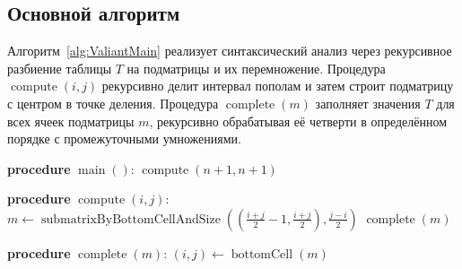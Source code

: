 \subsection{Основной алгоритм}

Алгоритм~\ref{alg:ValiantMain} реализует синтаксический анализ через рекурсивное разбиение таблицы $T$ на подматрицы и их перемножение.
Процедура $\operatorname{compute}(i, j)$ рекурсивно делит интервал пополам и затем строит подматрицу с центром в точке деления.
Процедура $\operatorname{complete}(m)$ заполняет значения $T$ для всех ячеек подматрицы $m$, рекурсивно обрабатывая её четверти в определённом порядке с промежуточными умножениями.

\begin{algorithm}[H]
  \caption{Алгоритм синтаксического анализа, основанный на перемножении матриц}
  \label{alg:ValiantMain}

  \textbf{procedure} $\operatorname{main}()$:\;
    $\operatorname{compute}(n+1, n+1)$\;

  \BlankLine
  \textbf{procedure} $\operatorname{compute}(i, j)$:\;
    $m \gets \operatorname{submatrixByBottomCellAndSize}((\frac{i+j}{2}-1, \frac{i+j}{2}), \frac{j-i}{2})$\;
    $\operatorname{complete}(m)$\;

  \BlankLine
  \textbf{procedure} $\operatorname{complete}(m)$:\;
    $(i, j) \gets \operatorname{bottomCell}(m)$\;
\end{algorithm}

